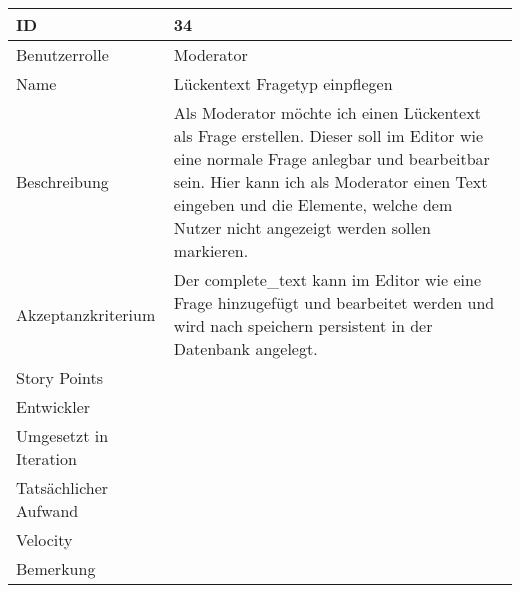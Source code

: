 \begin{tabularx}{\textwidth}{|p{}|X|}
	\hline
	ID & 34 \\
	\hline
	Benutzerrolle & Moderator \\
	\hline
	Name & Lückentext Fragetyp einpflegen\\
	\hline
	Beschreibung & Als Moderator möchte ich einen Lückentext als Frage erstellen.
		Dieser soll im Editor wie eine normale Frage anlegbar und bearbeitbar sein.
		Hier kann ich als Moderator einen Text eingeben und die Elemente, welche dem Nutzer nicht angezeigt werden sollen markieren.\\
	\hline
	Akzeptanzkriterium & Der complete_text kann im Editor wie eine Frage hinzugefügt und bearbeitet werden und wird nach speichern persistent in der Datenbank angelegt. \\
	\hline
	Story Points & \\
	\hline
	Entwickler & \\
	\hline
	Umgesetzt in Iteration & \\
	\hline
	Tatsächlicher Aufwand & \\
	\hline
	Velocity & \\
	\hline
	Bemerkung & \\
	\hline
\end{tabularx}
\vspace{20pt}
